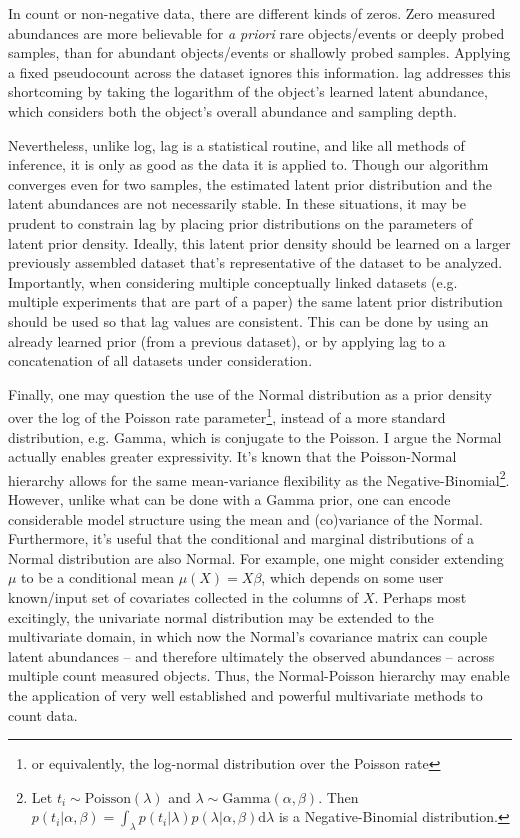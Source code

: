 \documentclass[11pt]{article}
\begin{document}
In count or non-negative data, there are different kinds of zeros. Zero measured abundances are more believable for \emph{a priori} rare objects/events or deeply probed samples, than for abundant objects/events or shallowly probed samples. Applying a fixed pseudocount across the dataset ignores this information. lag addresses this shortcoming by taking the logarithm of the object's learned latent abundance, which considers both the object's overall abundance and sampling depth.

Nevertheless, unlike log, lag is a statistical routine, and like all methods of inference, it is only as good as the data it is applied to. Though our algorithm converges even for two samples, the estimated latent prior distribution and the latent abundances are not necessarily stable. In these situations, it may be prudent to constrain lag by placing prior distributions on the parameters of latent prior density. Ideally, this latent prior density should be learned on a larger previously assembled dataset that's representative of the dataset to be analyzed. Importantly, when considering multiple conceptually linked datasets (e.g. multiple experiments that are part of a paper) the same latent prior distribution should be used so that lag values are consistent. This can be done by using an already learned prior (from a previous dataset), or by applying lag to a concatenation of all datasets under consideration.

Finally, one may question the use of the Normal distribution as a prior density over the log of the Poisson rate parameter\footnote[4]{or equivalently, the log-normal distribution over the Poisson rate}, instead of a more standard distribution, e.g. Gamma, which is conjugate to the Poisson. I argue the Normal actually enables greater expressivity. It's known that the Poisson-Normal hierarchy allows for the same mean-variance flexibility as the Negative-Binomial\footnote{Let $t_i \sim \textrm{Poisson}(\lambda)$ and $\lambda \sim \textrm{Gamma}(\alpha, \beta)$. Then $p(t_i|\alpha,\beta) = \int_\lambda p(t_i|\lambda)p(\lambda|\alpha,\beta)\textrm{d}\lambda$ is a Negative-Binomial distribution.}. However, unlike what can be done with a Gamma prior, one can  encode considerable model structure using the mean and (co)variance of the Normal. Furthermore, it's useful that the conditional and marginal distributions of a Normal distribution are also Normal. For example, one might consider extending $\mu$ to be a conditional mean $\mu(X) = X\beta$, which depends on some user known/input set of covariates collected in the columns of $X$. Perhaps most excitingly, the univariate normal distribution may be extended to the multivariate domain, in which now the Normal's covariance matrix can couple latent abundances -- and therefore ultimately the observed abundances -- across multiple count measured objects. Thus, the Normal-Poisson hierarchy may enable the application of very well established and powerful multivariate methods to count data.  
\end{document}

